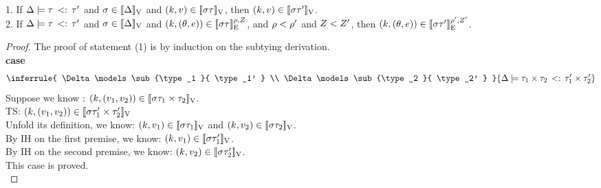 \clearpage
\begin{lem}\label{lem:sub_sound}
1. If $ \Delta \models  \tau  \, <: \,  \tau'  $ and $ \sigma \in [\![ \Delta ]\!]_{\text{V}}$ and  $(k, v) \in [\![ \sigma \tau ]\!]_{\text{V}}$,  then  $(k, v) \in [\![ \sigma \tau' ]\!]_{\text{V}}$.
  \\
 2. If $ \Delta \models  \tau  \, <: \,  \tau'  $ and $ \sigma \in
 [\![ \Delta ]\!]_{\text{V}}$ and  $(k, (\theta, e)) \in
 [\![ \sigma \tau ]\!]_{\text{E}}^{\rho, Z}$, and $\rho < \rho'$ and $Z < Z' $,  then  $(k, (\theta, e)) \in [\![ \sigma \tau' ]\!]_{\text{E}}^{\rho', Z'}$.
   \\
\end{lem}
%
\begin{proof} The proof of statement (1) is by induction on the
  subtying derivation.\\
\textbf{case}
\[ 
 \inferrule{
     \Delta \models \sub{\type_1 }{ \type_1'  } \\
         \Delta \models \sub{\type_2 }{ \type_2'  }
    }{
       \Delta \models \sub{\type_1 \times \type_2 }{ \type_1' \times \type_2'  }
    }
\]
Suppose we know : $ (k, (v_1, v_2)) \in [\![ \sigma \tau_1 \times \tau_2 ]\!]_{\text{V}} $.\\
TS:  $ (k, (v_1, v_2)) \in [\![ \sigma \tau_1' \times \tau_2' ]\!]_{\text{V}} $ \\
Unfold its definition, we know: $  (k, v_1 ) \in [\![ \sigma \tau_1 ]\!]_{\text{V}} $ and $  (k, v_2 ) \in [\![ \sigma \tau_2 ]\!]_{\text{V}} $.\\
By IH on the first premise, we know: $  (k, v_1 ) \in [\![ \sigma \tau_1' ]\!]_{\text{V}} $.\\
By IH on the second premise, we know: $  (k, v_2 ) \in [\![ \sigma \tau_2' ]\!]_{\text{V}} $.\\
This case is proved.\\


\end{proof}
